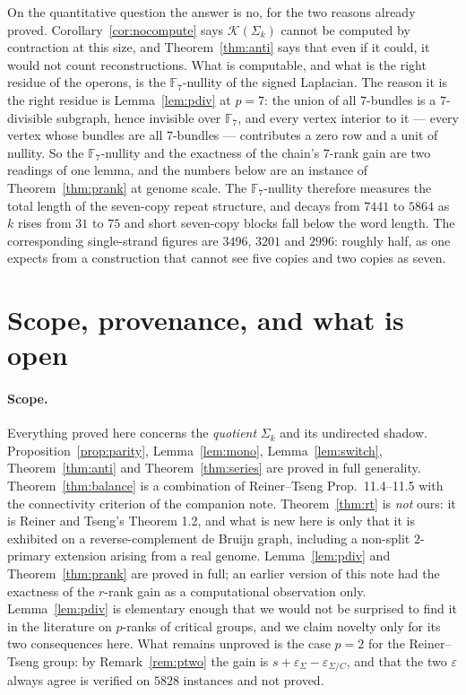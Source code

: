 \documentclass[11pt]{article}
\theoremstyle{plain}
\theoremstyle{definition}
\theoremstyle{remark}
\newcommand{\K}{\mathcal{K}}
\newcommand{\Sig}{\Sigma}
\begin{document}
On the quantitative question the answer is no, for the two reasons already proved.
Corollary~\ref{cor:nocompute} says $\K(\Sig_k)$ cannot be computed by contraction at this
size, and Theorem~\ref{thm:anti} says that even if it could, it would not count
reconstructions. What is computable, and what is the right residue of the operons, is the
$\mathbb{F}_7$-nullity of the signed Laplacian. The reason it is the right residue is
Lemma~\ref{lem:pdiv} at $p=7$: the union of all $7$-bundles is a $7$-divisible subgraph,
hence invisible over $\mathbb{F}_7$, and every vertex interior to it --- every vertex whose
bundles are all $7$-bundles --- contributes a zero row and a unit of nullity. So the
$\mathbb{F}_7$-nullity and the exactness of the chain's $7$-rank gain are two readings of one
lemma, and the numbers below are an instance of Theorem~\ref{thm:prank} at genome scale.
The $\mathbb{F}_7$-nullity therefore measures the
total length of the seven-copy repeat structure, and decays from $7441$ to $5864$ as $k$
rises from $31$ to $75$ and short seven-copy blocks fall below the word length. The
corresponding single-strand figures are $3496$, $3201$ and $2996$: roughly half, as one
expects from a construction that cannot see five copies and two copies as seven.

\section{Scope, provenance, and what is open}

\paragraph{Scope.} Everything proved here concerns the \emph{quotient} $\Sig_k$ and its
undirected shadow. Proposition~\ref{prop:parity}, Lemma~\ref{lem:mono},
Lemma~\ref{lem:switch}, Theorem~\ref{thm:anti} and Theorem~\ref{thm:series} are proved in
full generality. Theorem~\ref{thm:balance} is a combination of Reiner--Tseng
Prop.~11.4--11.5 with the connectivity criterion of the companion note. Theorem~\ref{thm:rt}
is \emph{not} ours: it is Reiner and Tseng's Theorem 1.2, and what is new here is only that
it is exhibited on a reverse-complement de Bruijn graph, including a non-split $2$-primary
extension arising from a real genome. Lemma~\ref{lem:pdiv} and Theorem~\ref{thm:prank} are
proved in full; an earlier version of this note had the exactness of the $r$-rank gain as a
computational observation only. Lemma~\ref{lem:pdiv} is elementary enough that we would not
be surprised to find it in the literature on $p$-ranks of critical groups, and we claim
novelty only for its two consequences here. What remains unproved is the case $p=2$ for the
Reiner--Tseng group: by Remark~\ref{rem:ptwo} the gain is $s+\varepsilon_\Sig-
\varepsilon_{\Sig/C}$, and that the two $\varepsilon$ always agree is verified on $5828$
instances and not proved.
\end{document}

